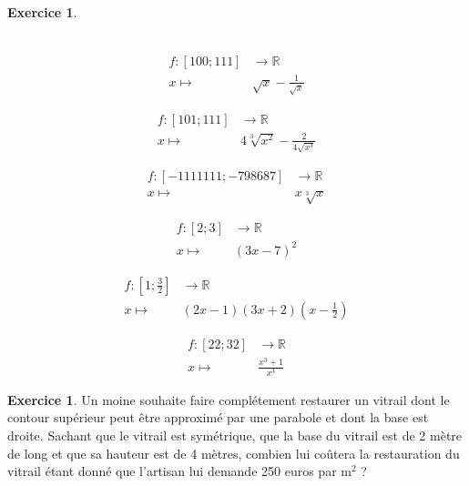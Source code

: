 \documentclass[a4paper,fontsize=13pt]{scrreprt}
\theoremstyle{plain}
\theoremstyle{definition}
\newtheorem{exo}[subsection]{Exercice}
\newcommand{\rr}{\mathbb{R}}
\begin{document}
\begin{exo}
\begin{enumerate}
\begin{multicols}{2}
\begin{align*}
\end{align*}
\item \begin{align*}
f : [100;111] &\to \rr \\
x \mapsto& \sqrt{x}-\frac{1}{\sqrt{x}}
\end{align*}
\item \begin{align*}
f : [101;111] &\to \rr \\
x \mapsto& 4\sqrt[3]{x^2}-\frac{2}{4\sqrt{x^3}}
\end{align*}
\item \begin{align*}
f : [-1111111;-798687] &\to \rr \\
x \mapsto& x\sqrt[3]{x}
\end{align*}
\item \begin{align*}
f : [2;3] &\to \rr \\
x \mapsto& (3x-7)^2
\end{align*}
\item \begin{align*}
f : [1;\frac{3}{2}] &\to \rr \\
x \mapsto& (2x-1)(3x+2)(x-\frac{1}{2})
\end{align*}
\item \begin{align*}
f : [22;32] &\to \rr \\
x \mapsto& \frac{x^3+1}{x^3}
\end{align*}
\end{multicols}
\end{enumerate}
\end{exo}

\begin{exo}
Un moine souhaite faire complétement restaurer un vitrail dont le contour supérieur peut être approximé par une parabole et dont la base est droite. Sachant que le vitrail est symétrique, que la base du vitrail est de 2 mètre de long et que sa hauteur est de 4 mètres, combien lui coûtera la restauration du vitrail étant donné que l'artisan lui demande 250 euros par m$^2$ ?
\end{exo}
\end{document}
